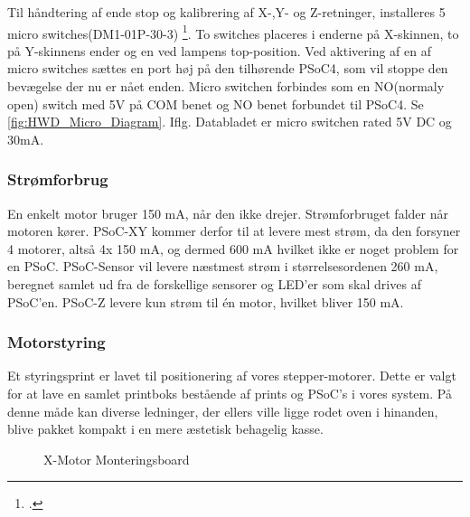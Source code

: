 Til håndtering af ende stop og kalibrering af X-,Y- og Z-retninger, installeres 5 micro switches(DM1-01P-30-3) \footcite{DM1-01P-30-3}. To switches placeres i enderne på X-skinnen, to på Y-skinnens ender og en ved lampens top-position. Ved aktivering af en af micro switches sættes en port høj på den tilhørende PSoC4, som vil stoppe den bevægelse der nu er nået enden.
Micro switchen forbindes som en NO(normaly open) switch med 5V på COM benet og NO benet forbundet til PSoC4. Se \ref{fig:HWD_Micro_Diagram}.
Iflg. Databladet er micro switchen rated 5V DC og 30mA.

\subsubsection{Strømforbrug}

En enkelt motor bruger 150 mA, når den ikke drejer. Strømforbruget falder når motoren kører. PSoC-XY kommer derfor til at levere mest strøm, da den forsyner 4 motorer, altså 4x 150 mA, og dermed 600 mA hvilket ikke er noget problem for en PSoC. PSoC-Sensor vil levere næstmest strøm i størrelsesordenen 260 mA, beregnet samlet ud fra de forskellige sensorer og LED’er som skal drives af PSoC’en. PSoC-Z levere kun strøm til én motor, hvilket bliver 150 mA.

\subsubsection{Motorstyring}

Et styringsprint er lavet til positionering af vores stepper-motorer. Dette er valgt for at lave en samlet printboks bestående af prints og PSoC’s i vores system. På denne måde kan diverse ledninger, der ellers ville ligge rodet oven i hinanden, blive pakket kompakt i en mere æstetisk behagelig kasse.

\begin{figure}[H] \centering
    \caption{X-Motor Monteringsboard}
    \label{fig:XVogn}
\end{figure}

